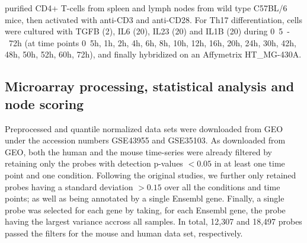 \textcite{yosef2013dynamic} purified CD4+ T-cells from spleen and lymph nodes from wild type C57BL/6 mice, then activated with anti-CD3 and anti-CD28. For Th17 differentiation, cells were cultured with TGFB (\unit{2}{\nano\gram\per\milli\liter}), IL6 (\unit{20}{\nano\gram\per\milli\liter}), IL23 (\unit{20}{\nano\gram\per\milli\liter}) and IL1B (\unit{20}{\nano\gram\per\milli\liter}) during \unit{0.5-72}{h} (at time points \unit{0.5}{h}, \unit{1}{h}, \unit{2}{h}, \unit{4}{h}, \unit{6}{h}, \unit{8}{h}, \unit{10}{h}, \unit{12}{h}, \unit{16}{h}, \unit{20}{h}, \unit{24}{h}, \unit{30}{h}, \unit{42}{h}, \unit{48}{h}, \unit{50}{h}, \unit{52}{h}, \unit{60}{h}, \unit{72}{h}), and finally hybridized on an Affymetrix HT\_MG-430A.


\subsection{Microarray processing, statistical analysis and node scoring}
\label{sub:statistical_analysis_and_node_scoring}



Preprocessed and quantile normalized data sets were downloaded from GEO under the accession numbers GSE43955 and GSE35103.
As downloaded from GEO, both the human and the mouse time-series were already filtered by retaining only the probes with detection p-values $< 0.05$ in at least one time point and one condition.
Following the original studies, we further only retained probes having a standard deviation $> 0.15$ over all the conditions and time points; as well as being annotated by a single Ensembl gene.
Finally, a single probe was selected for each gene by taking, for each Ensembl gene, the probe having the largest variance accross all samples.
In total, 12,307 and 18,497 probes passed the filters for the mouse and human data set, respectively.

